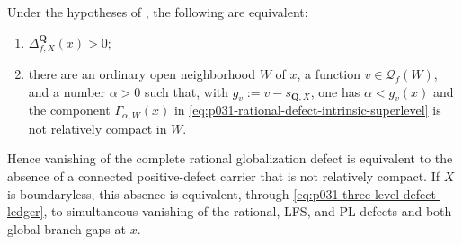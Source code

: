 \begin{corollary}
\label{cor:p031-rational-defect-end-characterization}
Under the hypotheses of , the
following are equivalent:
\begin{enumerate}[label=\textup{(\roman*)}]
\item
$\Delta^{\mathbf Q}_{f,X}(x)>0$;
\item
there are an ordinary open neighborhood $W$ of $x$, a function
$v\in\mathcal Q_f(W)$, and a number $\alpha>0$ such that, with
$g_v:=v-s_{\mathbf Q,X}$, one has $\alpha<g_v(x)$ and the component
$\Gamma_{\alpha,W}(x)$ in
\eqref{eq:p031-rational-defect-intrinsic-superlevel} is not relatively
compact in $W$.
\end{enumerate}
Hence vanishing of the complete rational globalization defect is equivalent
to the absence of a connected positive-defect carrier that is not relatively
compact.  If $X$ is boundaryless, this absence is equivalent, through
\eqref{eq:p031-three-level-defect-ledger}, to simultaneous vanishing of the
rational, LFS, and PL defects and both global branch gaps at $x$.
\end{corollary}
